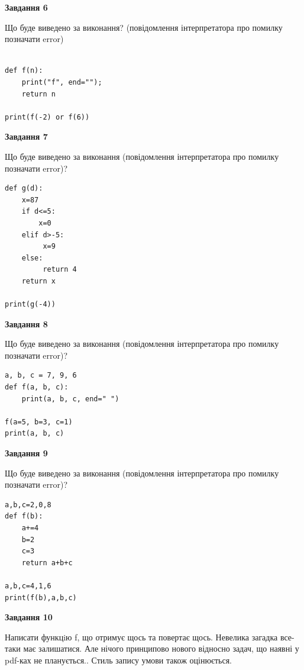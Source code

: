 \documentclass[12pt, ukrainian]{article}
\begin{document}
{\begin {large}
{\begin {center}\textbf{Завдання 6}\end {center}}

Що буде виведено за виконання? (повідомлення інтерпретатора про помилку позначати error)\par
\begin{verbatim}

def f(n):
    print("f", end="");
    return n

print(f(-2) or f(6))
\end{verbatim}

{\begin {center}\textbf{Завдання 7}\end {center}}

Що буде виведено за виконання (повідомлення інтерпретатора про помилку позначати error)?\par
\begin{verbatim}
def g(d):
    x=87
    if d<=5: 
        x=0
    elif d>-5:
         x=9
    else:
         return 4
    return x

print(g(-4))
\end{verbatim}

{\begin {center}\textbf{Завдання 8}\end {center}}

Що буде виведено за виконання (повідомлення інтерпретатора про помилку позначати error)?\par
\begin{verbatim}
a, b, c = 7, 9, 6
def f(a, b, c):
    print(a, b, c, end=" ")

f(a=5, b=3, c=1)
print(a, b, c)
\end{verbatim}

{\begin {center}\textbf{Завдання 9}\end {center}}

Що буде виведено за виконання (повідомлення інтерпретатора про помилку позначати error)?\par
\begin{verbatim}
a,b,c=2,0,8
def f(b):
    a+=4
    b=2
    c=3
    return a+b+c

a,b,c=4,1,6
print(f(b),a,b,c)
\end{verbatim}

{\begin {center}\textbf{Завдання 10}\end {center}}


Написати функцiю f, що отримує щось та повертає щось. Невелика загадка все-таки має залишатися. Але нічого принципово нового відносно задач, що наявні у pdf-ках не планується.. Стиль запису умови також оцінюється.\par
\end {large}}
\newpage
\end{document}

